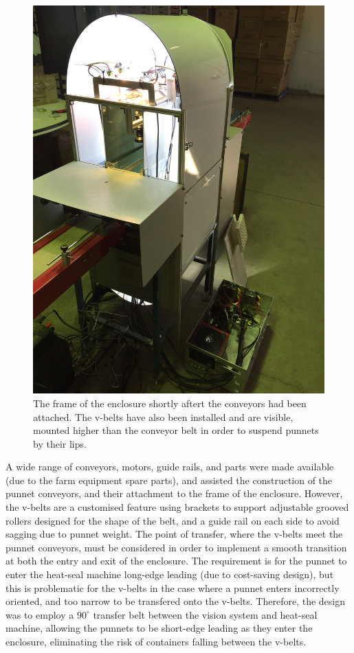 \documentclass[fleqn,twoside,12pt]{report}
\begin{document}
\begin{figure}[h]
	\centering
	\includegraphics[width=.6\linewidth,angle=270]{system_construct_3.JPG}
	\caption{The frame of the enclosure shortly aftert the conveyors had been attached. The v-belts have also been installed and are visible, mounted higher than the conveyor belt in order to suspend punnets by their lips.}
	\label{fig:system_construct_3}
\end{figure}%


A wide range of conveyors, motors, guide rails, and parts were made available (due to the farm equipment spare parts), and assisted the construction of the punnet conveyors, and their attachment to the frame of the enclosure. However, the v-belts are a customised feature using brackets to support adjustable grooved rollers designed for the shape of the belt, and a guide rail on each side to avoid sagging due to punnet weight. The point of transfer, where the v-belts meet the punnet conveyors, must be considered in order to implement a smooth transition at both the entry and exit of the enclosure. The requirement is for the punnet to enter the heat-seal machine long-edge leading (due to cost-saving design), but this is problematic for the v-belts in the case where a  punnet enters incorrectly oriented, and too narrow to be transfered onto the v-belts. Therefore, the design was to employ a $90^{\circ}$ transfer belt between the vision system and heat-seal machine, allowing the punnets to be short-edge leading as they enter the enclosure, eliminating the risk of containers falling between the v-belts. 
\end{document}
